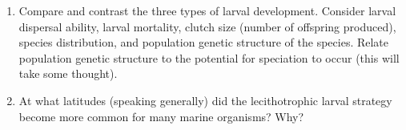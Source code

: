 \documentclass[nofonts, letterpaper]{tufte-handout}
\begin{document}
\begin{enumerate}
 \item
  Compare and contrast the three types of larval development. Consider
  larval dispersal ability, larval mortality, clutch size (number of
  offspring produced), species distribution, and population genetic
  structure of the species. Relate population genetic structure to the
  potential for speciation to occur (this will take some thought).

\item At what latitudes (speaking generally) did the lecithotrophic larval strategy become more common for many marine organisms?  Why?

\end{enumerate}
\end{document}
